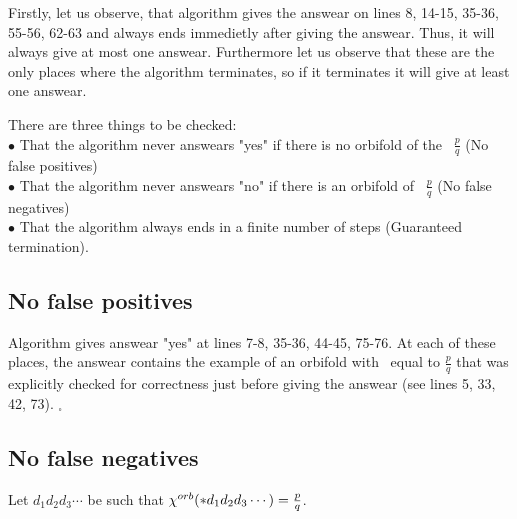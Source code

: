 Firstly, let us observe, that algorithm gives the answear on lines 8, 14-15, 35-36, 55-56, 
62-63 and 
always ends immedietly after giving the answear. Thus, it will always give at most one answear.
Furthermore let us observe that these are the only places where the algorithm terminates, 
so if it terminates it will give at least one answear.
 
There are three things to be checked: \\
$\bullet$ That the algorithm never answears "yes" if there is no orbifold of the \Eoc\ 
$\frac{p}{q}$ (No false positives)\\
$\bullet$ That the algorithm never answears "no" if there is an orbifold of \Eoc\ 
$\frac{p}{q}$ (No false negatives)\\ 
$\bullet$ That the algorithm always ends in a finite number of steps (Guaranteed termination). 








\subsection{No false positives}
Algorithm gives answear "yes" at lines 7-8, 35-36, 44-45, 75-76. At each of these places, 
the answear contains the example of an orbifold with \Eoc\ equal to $\frac{p}{q}$ that was 
explicitly checked for correctness just before giving the answear (see lines 5, 33, 42, 73). 
$_\square$    
\subsection{No false negatives}
Let $d_1d_2d_3\cdots$ be such that ${\chi^{orb}(*d_1d_2d_3\cdots)} = \frac{p}{q}$. 

